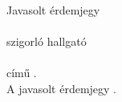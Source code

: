 \documentclass[a4paper,12pt]{article}
\begin{document}
\thispagestyle{empty}
\begin{center}
 \huge
 Javasolt érdemjegy\\
 \normalsize
 \vspace{1.5cm}
 \textbf{\jelolt}\\
 szigorló \kepzes{} hallgató\\
 \dolgozatcim\\
 című \dolgozattipusahoz{}.\\
 \vspace{1cm}
 A javasolt érdemjegy \textbf{\erdemjegy{}}.
\end{center}

\alairas
\end{document}
